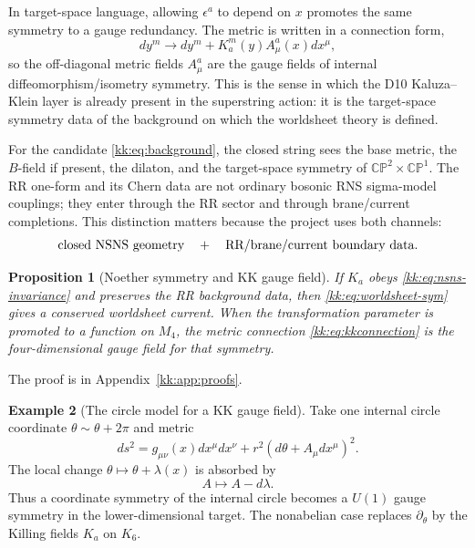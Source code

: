 \documentclass[11pt]{article}
\newcommand{\CP}{\mathbb{CP}}
\theoremstyle{plain}
\newtheorem{proposition}{Proposition}[section]
\theoremstyle{definition}
\newtheorem{example}[proposition]{Example}
\begin{document}
In target-space language, allowing \(\epsilon^a\) to depend on \(x\) promotes
the same symmetry to a gauge redundancy.  The metric is written in a connection
form,
\begin{equation}
  dy^m\longrightarrow dy^m+K_a^m(y)A_\mu^a(x)dx^\mu ,
  \label{kk:eq:kkconnection}
\end{equation}
so the off-diagonal metric fields \(A_\mu^a\) are the gauge fields of internal
diffeomorphism/isometry symmetry.  This is the sense in which the D10
Kaluza--Klein layer is already present in the superstring action: it is the
target-space symmetry data of the background on which the worldsheet theory is
defined.

For the candidate \eqref{kk:eq:background}, the closed string sees the base metric,
the \(B\)-field if present, the dilaton, and the target-space symmetry of
\(\CP^2\times\CP^1\).  The RR one-form and its Chern data are not ordinary
bosonic RNS sigma-model couplings; they enter through the RR sector and through
brane/current completions.  This distinction matters because the project uses
both channels:
\begin{equation}
  \hbox{closed NSNS geometry}\quad+\quad
  \hbox{RR/brane/current boundary data}.
\end{equation}

\begin{proposition}[Noether symmetry and KK gauge field]
\label{kk:prop:kk-noether}
If \(K_a\) obeys \eqref{kk:eq:nsns-invariance} and preserves the RR background
data, then \eqref{kk:eq:worldsheet-sym} gives a conserved worldsheet current.
When the transformation parameter is promoted to a function on \(M_4\), the
metric connection \eqref{kk:eq:kkconnection} is the four-dimensional gauge field
for that symmetry.
\end{proposition}
The proof is in Appendix~\ref{kk:app:proofs}.

\begin{example}[The circle model for a KK gauge field]
\label{kk:ex:circle-kk}
Take one internal circle coordinate \(\theta\sim\theta+2\pi\) and metric
\[
  ds^2=g_{\mu\nu}(x)dx^\mu dx^\nu+r^2(d\theta+A_\mu dx^\mu)^2 .
\]
The local change \(\theta\mapsto\theta+\lambda(x)\) is absorbed by
\[
  A\mapsto A-d\lambda .
\]
Thus a coordinate symmetry of the internal circle becomes a \(U(1)\) gauge
symmetry in the lower-dimensional target.  The nonabelian case replaces
\(\partial_\theta\) by the Killing fields \(K_a\) on \(K_6\).
\end{example}
\end{document}
